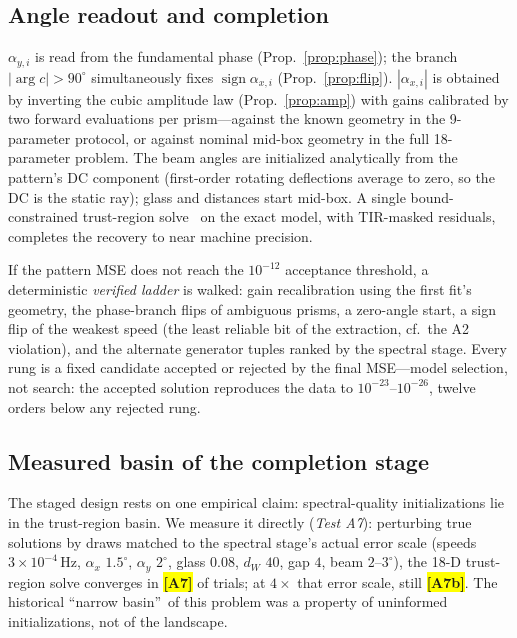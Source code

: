 \documentclass[twocolumn,preprintnumbers,amsmath,amssymb,pra,floatfix]{revtex4-2}
\newcommand{\PH}[1]{\colorbox{yellow}{\textbf{\small [#1]}}}
\begin{document}
\subsection{Angle readout and completion}
\label{sec:angleread}

$\alpha_{y,i}$ is read from the fundamental phase
(Prop.~\ref{prop:phase}); the branch $|{\arg c}|>90^\circ$
simultaneously fixes $\operatorname{sign}\alpha_{x,i}$
(Prop.~\ref{prop:flip}).  $|\alpha_{x,i}|$ is obtained by inverting
the cubic amplitude law (Prop.~\ref{prop:amp}) with gains calibrated
by two forward evaluations per prism---against the known geometry in
the 9-parameter protocol, or against nominal mid-box geometry in the
full 18-parameter problem.  The beam angles are initialized
analytically from the pattern's DC component (first-order rotating
deflections average to zero, so the DC is the static ray); glass and
distances start mid-box.  A single bound-constrained trust-region
solve~\cite{Branch1999} on the exact model, with TIR-masked residuals,
completes the recovery to near machine precision.

If the pattern MSE does not reach the $10^{-12}$ acceptance
threshold, a deterministic \emph{verified ladder} is walked: gain
recalibration using the first fit's geometry, the phase-branch flips
of ambiguous prisms, a zero-angle start, a sign flip of the weakest
speed (the least reliable bit of the extraction, cf.\ the A2
violation), and the alternate generator tuples ranked by the spectral
stage.  Every rung is a fixed candidate accepted or rejected by the
final MSE---model selection, not search: the accepted solution
reproduces the data to $10^{-23}$--$10^{-26}$, twelve orders below any
rejected rung.

\subsection{Measured basin of the completion stage}
\label{sec:basin}

The staged design rests on one empirical claim: spectral-quality
initializations lie in the trust-region basin.  We measure it
directly (\emph{Test A7}): perturbing true solutions by draws matched
to the spectral stage's actual error scale (speeds
$3\times10^{-4}$\,Hz, $\alpha_x$ $1.5^\circ$, $\alpha_y$ $2^\circ$,
glass $0.08$, $d_W$ $40$, gap $4$, beam $2$--$3^\circ$), the 18-D
trust-region solve converges in \PH{A7} of trials; at $4\times$ that
error scale, still \PH{A7b}.  The historical
\textquotedblleft narrow basin\textquotedblright\ of this problem was
a property of uninformed initializations, not of the landscape.
\end{document}
